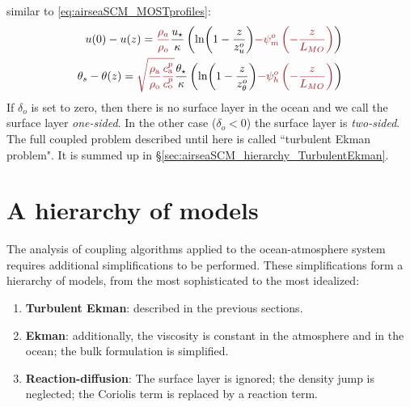 similar to \eqref{eq:airseaSCM_MOSTprofiles}:
\begin{equation}
\label{eq:airseaSCM_MOSTprofilesOSL}
\begin{aligned}
	u(0)-u(z) = \emphase{\frac{\rho_a}{\rho_o}}
	\frac{u_\star}{\kappa}
    \left(
	\ln(1-\frac{z}{z_{u}^o})
	\emphase{- \psi_m^o\left(-\frac{z}{L_{MO}}\right)}
    \right)
    \\
	\theta_s - \theta(z) = 
	\emphase{\sqrt{\frac{\rho_{\rm a}}{\rho_{\rm o}}
	\frac{c_{\rm a}^p}{c_{\rm o}^p}}}
	\frac{{\theta_\star}}{\kappa}
    \left(
	\ln(1-\frac{z}{z_{\theta}^o})
	\emphase{- \psi_h^o\left(-\frac{z}{L_{MO}}\right)}
\right)
\end{aligned}
\end{equation}
If $\delta_o$ is set to zero, then there is no surface layer
in the ocean and we call the surface layer \textit{one-sided}.
In the other case ($\delta_o<0$) the surface layer is
\textit{two-sided}.
The full coupled problem described until here
is called ``turbulent Ekman problem". It is summed up in
\S\ref{sec:airseaSCM_hierarchy_TurbulentEkman}.
\section{A hierarchy of models}
\label{sec:airseaSCM_hierarchy}
The analysis of coupling algorithms applied to the
ocean-atmosphere system requires additional
simplifications to be performed.
These simplifications form a hierarchy of models, from
the most sophisticated to the most idealized:
\begin{enumerate}
	\item \textbf{Turbulent Ekman}: described in the previous
		sections.
	\item \textbf{Ekman}: additionally,
		the viscosity is constant in the
		atmosphere and in the ocean; the bulk formulation
		is simplified.
	\item \textbf{Reaction-diffusion}: The surface layer is ignored;
		the density jump is neglected;
		the Coriolis term is replaced by a reaction term.
\end{enumerate}

